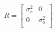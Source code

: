 \documentclass[12pt]{article}
\begin{document}

\[
R =
  \begin{bmatrix}
\sigma_r^{2}  & 0\\
0 & \sigma_a^{2} \\
  \end{bmatrix}
\]
\end{document}
